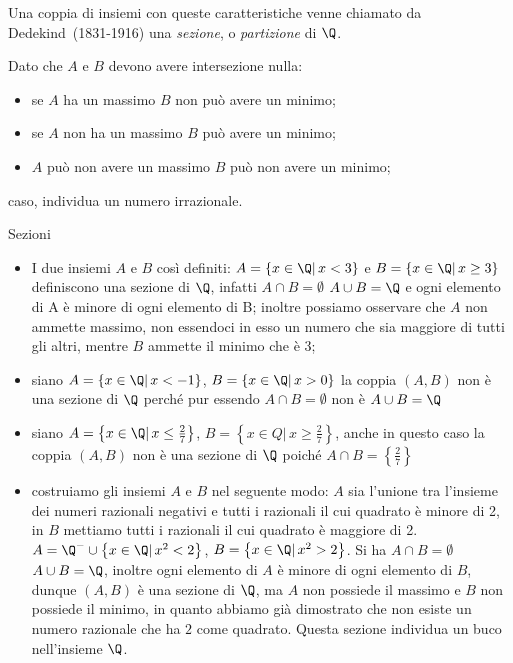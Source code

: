 Una coppia di insiemi con queste caratteristiche venne chiamato da 
Dedekind~(1831-1916) una \emph{sezione}, o \emph{partizione} di \(\Q\).

Dato che \(A\) e \(B\) devono avere intersezione nulla:

\begin{itemize} [noitemsep]
 \item se \(A\) ha un massimo \(B\) non può avere un minimo;
 \item se \(A\) non ha un massimo \(B\) può avere un minimo;
 \item \(A\) può non avere un massimo \(B\) può non avere un minimo;
\end{itemize} 

caso, individua un numero irrazionale.

\begin{esempi}{}{}
Sezioni
\begin{itemize}[leftmargin=0cm, itemindent=.5cm]
\item I due insiemi \(A\) e \(B\) così definiti: 
\(A=\left\{x\in \Q |\, x<3\right\}\) e
\(B=\left\{x\in \Q |\, x \ge 3\right\}\) 
definiscono una sezione di \(\Q\), 
infatti \(A \cap B=\emptyset\) \(A \cup B=\Q\) e ogni elemento di A è 
minore 
di ogni elemento di B; 
inoltre possiamo osservare che \(A\) non ammette massimo,
non essendoci in esso un numero che sia maggiore di tutti gli altri, 
mentre \(B\) ammette il minimo che è 3;
 \item siano \(A=\left\{x\in \Q |\, x<-1\right\}\), \(B=\left\{x \in \Q 
|\, 
x>0\right\}\) la coppia \((A,B)\) non è una sezione di \(\Q\) perché pur 
essendo 
\(A\cap B=\emptyset\) non è \(A\cup B=\Q\)
 \item siano \(A=\left\{x\in \Q |\, x \le \frac{2}{7}\right\}\), 
\(B=\left\{x 
\in Q |\, x \ge \frac{2}{7}\right\}\), anche in questo caso la coppia 
\((A,B)\) 
non è una sezione di \(\Q\) poiché \(A\cap B=\left\{\frac{2}{7}\right\}\)
 \item costruiamo gli insiemi \(A\) e \(B\) nel seguente modo: \(A\) sia 
l'unione tra 
l'insieme dei numeri razionali negativi e tutti i razionali il cui 
quadrato è minore di 2, in \(B\) mettiamo tutti i razionali il cui 
quadrato è maggiore di 2. 
\(A=\Q^{-} \cup \left\{x \in \Q |\, x^{2}<2\right\}\), 
\(B=\left\{x \in \Q |\, x^{2}>2\right\}\). 
Si ha \(A \cap B=\emptyset\) \(A\cup B=\Q\), inoltre ogni elemento di 
\(A\) è minore di ogni elemento di \(B\), dunque \((A,B)\) è una sezione 
di \(\Q\), ma \(A\) non possiede il massimo e \(B\) non possiede il 
minimo, in quanto abbiamo già dimostrato che non esiste un numero 
razionale che ha \(2\) come quadrato. 
Questa sezione individua un buco nell'insieme \(\Q\).
\end{itemize}
\end{esempi}

